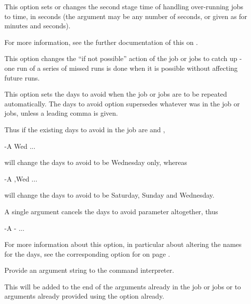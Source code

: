 This option sets or changes the second stage time of handling over-running jobs to time, in seconds (the argument may be any number of seconds, or given
as  for minutes and seconds).

For more information, see the further documentation of this on \pageref{btr:gracetime}.


This option changes the ``if not possible'' action of the job or jobs to catch up - one run of a series of missed runs is
done when it is possible without affecting future runs.


This option sets the days to avoid when the job or jobs are to be repeated automatically. The days to avoid option supersedes whatever
was in the job or jobs, unless a leading comma is given.

Thus if the existing days to avoid in the job are  and ,

\begin{expara}

\BtrName{} -A Wed ...

\end{expara}

will change the days to avoid to be Wednesday only, whereas

\begin{expara}

\BtrName{} -A ,Wed ...

\end{expara}

will change the days to avoid to be Saturday, Sunday and Wednesday.

A single \exampletext{{}-} argument cancels the days to avoid parameter altogether, thus

\begin{expara}

\BtrName{} -A {}- ...

\end{expara}

For more information about this option, in particular about altering the names for the
days, see the corresponding option for \PrBtr{} on page \pageref{btr:avoiding}.


Provide an argument string to the command interpreter.

This will be added to the end of the arguments already in the job or jobs or to arguments already provided using the  option already.

